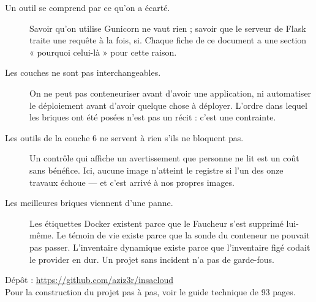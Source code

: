 \begin{description}
\item[Un outil se comprend par ce qu'on a écarté.] Savoir qu'on utilise Gunicorn
  ne vaut rien ; savoir que le serveur de Flask traite une requête à la fois,
  si. Chaque fiche de ce document a une section « pourquoi celui-là » pour cette
  raison.

\item[Les couches ne sont pas interchangeables.] On ne peut pas conteneuriser
  avant d'avoir une application, ni automatiser le déploiement avant d'avoir
  quelque chose à déployer. L'ordre dans lequel les briques ont été posées n'est
  pas un récit : c'est une contrainte.

\item[Les outils de la couche 6 ne servent à rien s'ils ne bloquent pas.]
  Un contrôle qui affiche un avertissement que personne ne lit est un coût sans
  bénéfice. Ici, aucune image n'atteint le registre si l'un des onze travaux
  échoue --- et c'est arrivé à nos propres images.

\item[Les meilleures briques viennent d'une panne.] Les étiquettes Docker
  existent parce que le Faucheur s'est supprimé lui-même. Le témoin de vie
  existe parce que la sonde du conteneur ne pouvait pas passer. L'inventaire
  dynamique existe parce que l'inventaire figé codait le provider en dur. Un
  projet sans incident n'a pas de garde-fous.
\end{description}

\vfill
\begin{center}
\color{gristexte}\small
Dépôt : \url{https://github.com/aziz3r/insacloud}\\
Pour la construction du projet pas à pas, voir le guide technique de 93 pages.
\end{center}
